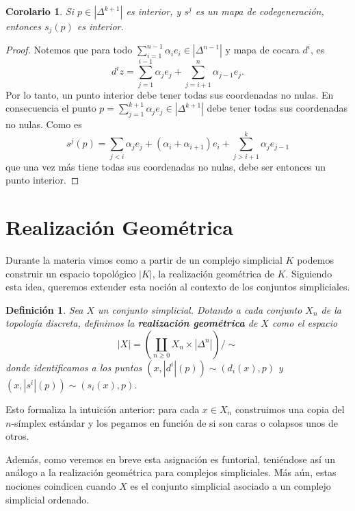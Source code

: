 \documentclass[11pt]{report}
\theoremstyle{colored}
\newtheorem{definition}{Definición}[section]
\newtheorem{corollary}{Corolario}[section]
\renewcommand{\ss}[1]{\Delta^{#1}}
\begin{document}
\begin{corollary} Si $p \in |\ss{k+1}|$ es interior, y $s^j$ es un mapa de codegeneración, entonces $s_j(p)$ es interior. 
\end{corollary}
\begin{proof} Notemos que para todo $\sum_{i=1}^{n-1}\alpha_ ie_i \in |\ss{n-1}|$ y mapa de cocara $d^i$, es 
\[
d^iz= \sum_{j=1}^{i-1}\alpha_j e_j + \sum_{j = i+1}^{n}\alpha_{j-1} e_j.
\]
Por lo tanto, un punto interior debe tener todas sus coordenadas no nulas. En consecuencia el punto $p = \sum_{j=1}^{k+1}\alpha_je_j \in |\ss{k+1}|$ debe tener todas sus coordenadas no nulas. Como es
\[
s^j(p) = \sum_{j < i}\alpha_j e_j + (\alpha_i+\alpha_{i+1})e_i + \sum_{j > i+1}^k \alpha_{j}e_{j-1}
\]
que una vez más tiene todas sus coordenadas no nulas, debe ser entonces un punto interior.
\end{proof}

\section{Realización Geométrica}

Durante la materia vimos como a partir de un complejo simplicial $K$ podemos construir un espacio topológico $|K|$, la realización geométrica de $K$. Siguiendo esta idea, queremos extender esta noción al contexto de los conjuntos simpliciales.

\begin{definition} Sea $X$ un conjunto simplicial. Dotando a cada conjunto $X_n$ de la topología discreta, definimos la \textbf{realización geométrica} de $X$ como el espacio
\[
|X| = \left(\coprod_{n \geq 0}X_n \times |\ss{n}|\right)\Big/\sim
\]
donde identificamos a los puntos $(x,|d^i|(p)) \sim (d_i(x),p)$ y $(x,|s^i|(p)) \sim (s_i(x),p)$.
\end{definition}

Esto formaliza la intuición anterior: para cada $x \in X_n$ construimos una copia del $n$-símplex estándar y los pegamos en función de si son caras o colapsos unos de otros.

Además, como veremos en breve esta asignación es funtorial, teniéndose así un análogo a la realización geométrica para complejos simpliciales. Más aún, estas nociones coindicen cuando $X$ es el conjunto simplicial asociado a un complejo simplicial ordenado.
\end{document}
